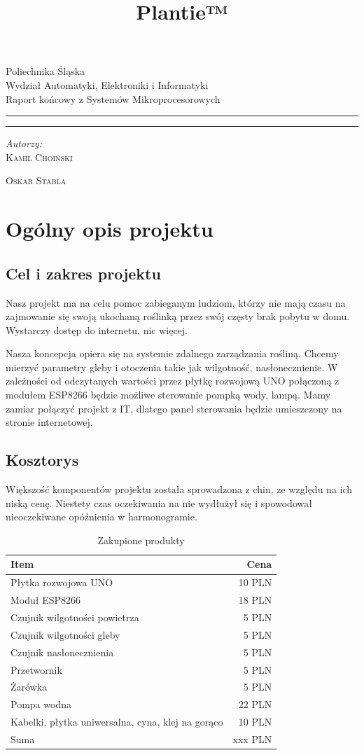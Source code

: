 \documentclass[12pt]{article}
\title{Plantie™}
\makeatletter
\newcommand{\linia}{\rule{\linewidth}{0.4mm}}
\renewcommand{\maketitle}{\begin{titlepage}
		\vspace*{1cm}
		\begin{center}\small
			Poliechnika Śląska\\
			Wydział Automatyki, Elektroniki i Informatyki\\
			Raport końcowy z Systemów Mikroprocesorowych
		\end{center}
		\vspace{3cm}
		\noindent\linia
		\begin{center}
			\LARGE \textsc{\@title}
		\end{center}
		\linia
		\vspace{0.5cm}
		\begin{flushright}
			\begin{minipage}{15cm}
				\textit{\small Autorzy:}\\
				\normalsize \textsc{Kamil Choiński} \par \textsc{Oskar Stabla} \par
			\end{minipage}	
		\end{flushright}
		\vspace*{\stretch{6}}
		\begin{center}
			\@date
		\end{center}
	\end{titlepage}
}
\makeatother
\begin{document}
\maketitle

\tableofcontents


\section{Ogólny opis projektu}


\subsection{Cel i zakres projektu}
Nasz projekt ma na celu pomoc zabieganym ludziom, którzy nie mają czasu na zajmowanie się
swoją ukochaną roślinką przez swój częsty brak pobytu w domu. Wystarczy dostęp do internetu,
nic więcej.

Nasza koncepcja opiera się na systemie zdalnego zarządzania rośliną. Chcemy mierzyć parametry
gleby i otoczenia takie jak wilgotność, nasłonecznienie. W zależności od odczytanych wartości przez
płytkę rozwojową UNO połączoną z modułem ESP8266 będzie możliwe sterowanie pompką wody,
lampą. Mamy zamiar połączyć projekt z IT, dlatego panel sterowania będzie umieszczony na stronie
internetowej.


\subsection{Kosztorys}
Większość komponentów projektu została sprowadzona z chin, ze względu na ich niską cenę. Niestety czas oczekiwania na nie wydłużył się i spowodował nieoczekiwane opóźnienia w harmonogramie.

\begin{table}[!h]
\centering
\begin{tabular}{l|r}
Item & Cena \\\hline
Płytka rozwojowa UNO & 10 PLN \\
Moduł ESP8266 & 18 PLN \\

Czujnik wilgotności powietrza & 5 PLN \\

Czujnik wilgotności gleby & 5 PLN \\

Czujnik nasłonecznienia & 5 PLN \\

Przetwornik & 5 PLN \\

Żarówka & 5 PLN \\

Pompa wodna & 22 PLN \\

Kabelki, płytka uniwersalna, cyna, klej na gorąco & 10 PLN 
\\ \hline
Suma & xxx PLN

\end{tabular}
\caption{\label{tab:widgets}Zakupione produkty}
\end{table}
\end{document}
